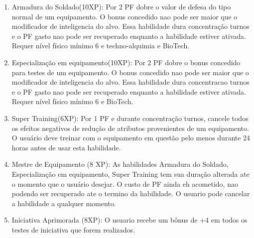 \begin{enumerate}
	\item Armadura do Soldado(10XP): Por 2 PF dobre o valor de defesa do tipo normal de um equipamento. O bonus concedido nao pode ser maior que o modificador de inteligencia do alvo. Essa habilidade dura concentração turnos e o PF gasto nao pode ser recuperado enquanto a habilidade estiver ativada. Requer nível físico mínimo 6 e techno-alquimia e BioTech. 

	\item Especialização em equipamento(10XP): Por 2 PF dobre o bonus concedido para testes de um equipamento. O bonus concedido nao pode ser maior que o modificador de inteligencia do alvo. Essa habilidade dura concentracao turnos e o PF gasto nao pode ser recuperado enquanto a habilidade estiver ativada. Requer nível físico mínimo 6 e BioTech. 

	\item Super Training(6XP): Por 1 PF e durante concentração turnos, cancele todos os efeitos negativos de redução de atributos provenientes de um equipamento. O usuário deve treinar com o equipamento em questão pelo menos durante 24 horas antes de usar esta habilidade. 

    \item Mestre de Equipamento (8 XP): As habilidades Armadura do Soldado, Especialização em equipamento, Super Training tem sua duração alterada ate o momento que o usuário desejar. O custo de PF ainda eh acometido, nao podendo ser recuperado ate o termino da habilidade. O usuario pode cancelar a habilidade a qualquer momento.




	\item Iniciativa Aprimorada (8XP): O usuario recebe um bônus de +4 em todos os testes de iniciativa que forem realizados.


\end{enumerate}
